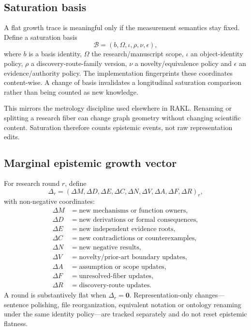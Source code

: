 \subsection{Saturation basis}

A flat growth trace is meaningful only if the measurement semantics stay fixed. Define a saturation basis
\[
\mathcal B=(b,\Omega,\iota,\rho,\nu,\epsilon),
\]
where \(b\) is a basis identity, \(\Omega\) the research/manuscript scope, \(\iota\) an object-identity policy, \(\rho\) a discovery-route-family version, \(\nu\) a novelty/equivalence policy and \(\epsilon\) an evidence/authority policy. The implementation fingerprints these coordinates content-wise. A change of basis invalidates a longitudinal saturation comparison rather than being counted as new knowledge.

This mirrors the metrology discipline used elsewhere in RAKL. Renaming or splitting a research fiber can change graph geometry without changing scientific content. Saturation therefore counts epistemic events, not raw representation edits.

\subsection{Marginal epistemic growth vector}

For research round \(r\), define
\[
\Delta_r=
(\Delta M,\Delta D,\Delta E,\Delta C,\Delta N,
\Delta V,\Delta A,\Delta F,\Delta R)_r,
\]
with non-negative coordinates:
\begin{align*}
\Delta M&=\text{new mechanisms or function owners},\\
\Delta D&=\text{new derivations or formal consequences},\\
\Delta E&=\text{new independent evidence roots},\\
\Delta C&=\text{new contradictions or counterexamples},\\
\Delta N&=\text{new negative results},\\
\Delta V&=\text{novelty/prior-art boundary updates},\\
\Delta A&=\text{assumption or scope updates},\\
\Delta F&=\text{unresolved-fiber updates},\\
\Delta R&=\text{discovery-route updates}.
\end{align*}
A round is substantively flat when \(\Delta_r=\mathbf 0\). Representation-only changes---sentence polishing, file reorganization, equivalent notation or ontology renaming under the same identity policy---are tracked separately and do not reset epistemic flatness.

